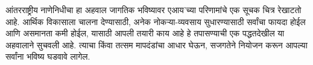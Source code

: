 आंतरराष्ट्रीय नाणेनिधीचा हा अहवाल जागतिक भविष्यावर एआय'च्या परिणामांचे एक सूचक चित्र रेखाटतो आहे. आर्थिक विकासाला चालना देण्यासाठी, अनेक नोकऱ्या-व्यवसाय सुधारण्यासाठी सर्वांचा फायदा होईल आणि असमानता कमी होईल, यासाठी आपली तयारी काय आहे हे तपासण्याची एक पद्धतदेखील या अहवालाने सुचवली आहे. त्याचा किंवा तत्सम मापदंडांचा आधार घेऊन, सजगतेने नियोजन करून आपल्या सर्वांना भविष्य घडवावे लागेल.

